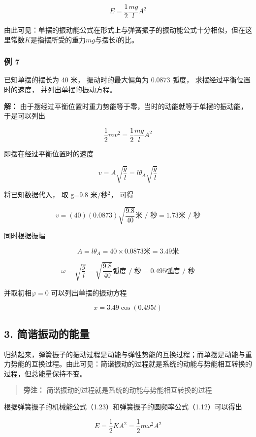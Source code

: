 \[
E=\frac12\frac{mg}{l}A^2 \tag{1.24}
\]

由此可见：单摆的振动能公式在形式上与弹簧振子的振动能公式十分相似，但在这里常数\(K\)是指摆所受的重力\(mg\)与摆长\(l\)的比。

\subsubsection{例 7}\label{ux4f8b-7}

已知单摆的摆长为 40 米， 振动时的最大偏角为 0.0873 弧度，
求摆经过平衡位置时的速度， 并列出单摆的振动方程。

\textbf{解：}
由于摆经过平衡位置时重力势能等于零，当时的动能就等于单摆的振动能，于是可以列出

\[
\frac {1}{2} m v ^ {2} = \frac {1}{2} \frac {m g}{l} A ^ {2}
\]

即摆在经过平衡位置时的速度

\[
v=A\sqrt{\frac{g}{l}}=l\theta_A\sqrt{\frac{g}{l}}
\]

将已知数据代入， 取 g=9.8 米/秒\(^{2}\)， 可得

\[
v = (40) (0.0873) \sqrt {\frac {9.8}{40}} \text{米 / 秒} = 1.73 \text{米 / 秒}
\]

同时根据振幅

\[
A = l \theta_ {A} = 40 \times 0.0873 \text{米} = 3.49 \text{米}
\]

\[
\omega = \sqrt {\frac {g}{l}} = \sqrt {\frac {9.8}{40}} \text{弧度 / 秒} = 0.495 \text{弧度 / 秒}
\]

并取初相\(\varphi = 0\) 可以列出单摆的振动方程

\[
x=3.49\cos(0.495t)
\]

\subsection{3.
简谐振动的能量}\label{ux7b80ux8c10ux632fux52a8ux7684ux80fdux91cf-1}

归纳起来，弹簧振子的振动过程是动能与弹性势能的互换过程；而单摆是动能与重力势能的互换过程。由此可见：简谐振动的过程就是系统的动能与势能相互转换的过程，但总能量保持不变。

\begin{quote}
\textbf{旁注：} 简谐振动的过程就是系统的动能与势能相互转换的过程
\end{quote}

根据弹簧振子的机械能公式（1.23）和弹簧振子的圆频率公式（1.12）可以得出

\[
E = \frac {1}{2} K A ^ {2} = \frac {1}{2} m \omega^ {2} A ^ {2} \tag {1.25}
\]

